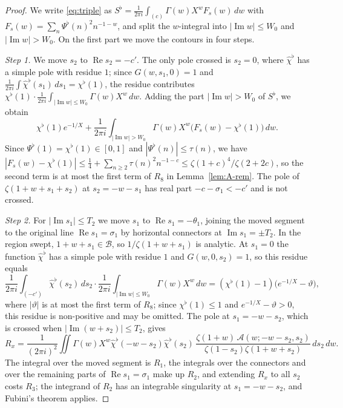 \documentclass[11pt]{amsart}
\numberwithin{equation}{section}
\theoremstyle{definition}
\theoremstyle{remark}
\newcommand{\Rp}{\operatorname{Re}}
\newcommand{\Ip}{\operatorname{Im}}
\begin{document}
\begin{proof}
We write \eqref{eq:triple} as $S^\flat = \frac1{2\pi i}\int_{(c)}\Gamma(w)X^wF_s(w)\,dw$ with $F_s(w) = \sum_n\Psi^\flat(n)^2n^{-1-w}$, and split the $w$-integral into $|\Ip w| \leq W_0$ and $|\Ip w| > W_0$.
On the first part we move the contours in four steps.

\emph{Step 1.}
We move $s_2$ to $\Rp s_2 = -c'$.
The only pole crossed is $s_2 = 0$, where $\hat\chi^\flat$ has a simple pole with residue $1$; since $G(w, s_1, 0) = 1$ and $\frac1{2\pi i}\int\hat\chi^\flat(s_1)\,ds_1 = \chi^\flat(1)$, the residue contributes $\chi^\flat(1)\cdot\frac1{2\pi i}\int_{|\Ip w|\leq W_0}\Gamma(w)X^w\,dw$.
Adding the part $|\Ip w| > W_0$ of $S^\flat$, we obtain
\[
\chi^\flat(1)e^{-1/X} + \frac1{2\pi i}\int_{|\Ip w| > W_0}\Gamma(w)X^w\big(F_s(w) - \chi^\flat(1)\big)\,dw.
\]
Since $\Psi^\flat(1) = \chi^\flat(1) \in [0, 1]$ and $|\Psi^\flat(n)| \leq \tau(n)$, we have $|F_s(w) - \chi^\flat(1)| \leq \frac14 + \sum_{n\geq2}\tau(n)^2n^{-1-c} \leq \zeta(1+c)^4/\zeta(2 + 2c)$, so the second term is at most the first term of $R_8$ in Lemma~\ref{lem:A-rem}.
The pole of $\zeta(1 + w + s_1 + s_2)$ at $s_2 = -w - s_1$ has real part $-c - \sigma_1 < -c'$ and is not crossed.

\emph{Step 2.}
For $|\Ip s_1| \leq T_2$ we move $s_1$ to $\Rp s_1 = -\theta_1$, joining the moved segment to the original line $\Rp s_1 = \sigma_1$ by horizontal connectors at $\Ip s_1 = \pm T_2$.
In the region swept, $1 + w + s_1 \in \mathcal B$, so $1/\zeta(1 + w + s_1)$ is analytic.
At $s_1 = 0$ the function $\hat\chi^\flat$ has a simple pole with residue $1$ and $G(w, 0, s_2) = 1$, so this residue equals
\[
\frac{1}{2\pi i}\int_{(-c')}\hat\chi^\flat(s_2)\,ds_2\cdot\frac1{2\pi i}\int_{|\Ip w|\leq W_0}\Gamma(w)X^w\,dw = (\chi^\flat(1) - 1)\big(e^{-1/X} - \vartheta\big),
\]
where $|\vartheta|$ is at most the first term of $R_8$; since $\chi^\flat(1) \leq 1$ and $e^{-1/X} - \vartheta > 0$, this residue is non-positive and may be omitted.
The pole at $s_1 = -w - s_2$, which is crossed when $|\Ip(w + s_2)| \leq T_2$, gives
\[
R_x = \frac1{(2\pi i)^2}\iint\Gamma(w)X^w\hat\chi^\flat(-w-s_2)\hat\chi^\flat(s_2)\,\frac{\zeta(1+w)\,\mathcal A(w; -w-s_2, s_2)}{\zeta(1 - s_2)\zeta(1 + w + s_2)}\,ds_2\,dw.
\]
The integral over the moved segment is $R_1$, the integrals over the connectors and over the remaining parts of $\Rp s_1 = \sigma_1$ make up $R_2$, and extending $R_x$ to all $s_2$ costs $R_3$; the integrand of $R_2$ has an integrable singularity at $s_1 = -w - s_2$, and Fubini's theorem applies.


\end{proof}
\end{document}

